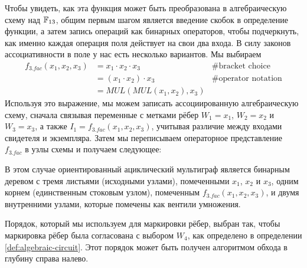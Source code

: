 \begin{example}
Чтобы увидеть, как эта функция может быть преобразована в алгебраическую схему над $\mathbb{F}_{13}$, общим первым шагом является введение скобок в определение функции, а затем запись операций как бинарных операторов, чтобы подчеркнуть, как именно каждая операция поля действует на свои два входа. В силу законов ассоциативности в поле у нас есть несколько вариантов. Мы выбираем
\begin{align*}
f_{3.fac}(x_1,x_2,x_3) & = x_1\cdot x_2 \cdot x_3  & \text{\# bracket choice} \\
                       & = (x_1\cdot x_2 ) \cdot x_3  & \text{\# operator notation} \\
                       & = MUL(MUL(x_1,x_2),x_3)
\end{align*}
Используя это выражение, мы можем записать ассоциированную алгебраическую схему, сначала связывая переменные с метками рёбер $W_1=x_1$, $W_2=x_2$ и $W_3=x_3$, а также $I_1=f_{3.fac}(x_1,x_2,x_3)$, учитывая различие между входами свидетеля и экземпляра. Затем мы переписываем операторное представление $f_{3.fac}$ в узлы схемы и получаем следующее: 
\begin{center}
\end{center}


В этом случае ориентированный ациклический мультиграф является бинарным деревом с тремя листьями (исходными узлами), помеченными $x_1$, $x_2$ и $x_3$, одним корнем (единственным стоковым узлом), помеченным $f_{3.fac}(x_1,x_2,x_3)$, и двумя внутренними узлами, которые помечены как вентили умножения. 

Порядок, который мы используем для маркировки рёбер, выбран так, чтобы маркировка рёбер была согласована с выбором $W_4$, как определено в определении \ref{def:algebraic-circuit}. Этот порядок может быть получен алгоритмом обхода в глубину справа налево.
\end{example}
